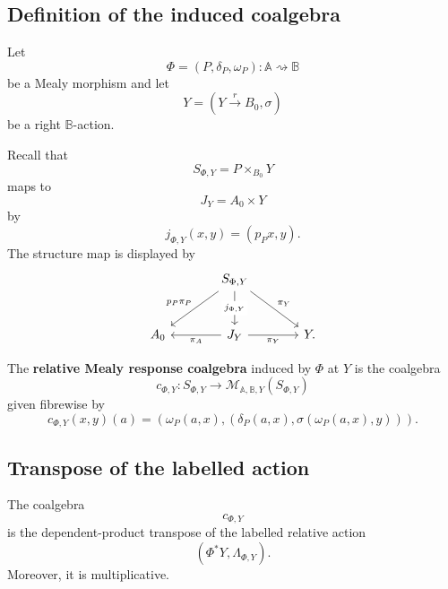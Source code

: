 \subsection{Definition of the induced coalgebra}
\label{subsec:poly-relative-induced-coalgebra-definition}

Let
\[
\Phi=(P,\delta_P,\omega_P):\mathbb A\rightsquigarrow\mathbb B
\]
be a Mealy morphism and let
\[
Y=(Y\xrightarrow{r}B_0,\sigma)
\]
be a right \(\mathbb B\)-action.

Recall that
\[
S_{\Phi,Y}=P\times_{B_0}Y
\]
maps to
\[
J_Y=A_0\times Y
\]
by
\[
j_{\Phi,Y}(x,y)=(p_Px,y).
\]
The structure map is displayed by
\[
\begin{tikzcd}[column sep=large,row sep=large]
&
S_{\Phi,Y}
  \arrow[dl,"p_P\pi_P"']
  \arrow[dr,"\pi_Y"]
  \arrow[d,"j_{\Phi,Y}" description]
&
\\
A_0
&
J_Y
  \arrow[l,"\pi_A"]
  \arrow[r,"\pi_Y"']
&
Y .
\end{tikzcd}
\]

\begin{definition}
\label{def:poly-relative-mealy-response-coalgebra}
The \textbf{relative Mealy response coalgebra} induced by \(\Phi\) at \(Y\) is
the coalgebra
\[
c_{\Phi,Y}:
S_{\Phi,Y}\to
\mathcal M_{\mathbb A,\mathbb B,Y}(S_{\Phi,Y})
\]
given fibrewise by
\[
c_{\Phi,Y}(x,y)(a)
=
\left(
\omega_P(a,x),
\left(
\delta_P(a,x),
\sigma(\omega_P(a,x),y)
\right)
\right).
\]
\end{definition}

\subsection{Transpose of the labelled action}
\label{subsec:poly-relative-mealy-coalgebra-transpose}

\begin{theorem}
\label{thm:poly-relative-mealy-coalgebra-transpose}
The coalgebra
\[
c_{\Phi,Y}
\]
is the dependent-product transpose of the labelled relative action
\[
(\Phi^\ast Y,\Lambda_{\Phi,Y}).
\]
Moreover, it is multiplicative.
\end{theorem}

